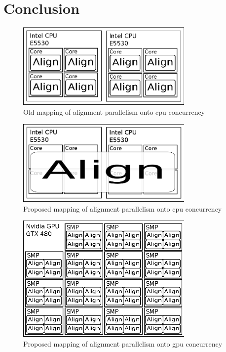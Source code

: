 \documentclass[10pt,twocolumn,letterpaper]{article}
\begin{document}
\section{Conclusion}



\begin{figure}
\centering
\includegraphics[width=3.4in]{figures/alignment_mapping_old}
\caption{Old mapping of alignment parallelism onto cpu concurrency}
\label{fig:alignment_mapping_old}
\end{figure}

\begin{figure}
\centering
\includegraphics[width=3.4in]{figures/alignment_mapping_cpu}
\caption{Proposed mapping of alignment parallelism onto cpu concurrency}
\label{fig:alignment_mapping_cpu}
\end{figure}

\begin{figure}
\centering
\includegraphics[width=3.4in]{figures/alignment_mapping_gpu}
\caption{Proposed mapping of alignment parallelism onto gpu concurrency}
\label{fig:alignment_mapping_gpu}
\end{figure}

{\small


}
\end{document}
